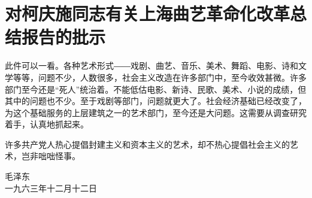 \section[对柯庆施同志有关上海曲艺革命化改革总结报告的批示（一九六三年十二月十二日）]{对柯庆施同志有关上海曲艺革命化改革总结报告的批示}


此件可以一看。各种艺术形式――戏剧、曲艺、音乐、美术、舞蹈、电影、诗和文学等等，问题不少，人数很多，社会主义改造在许多部门中，至今收效甚微。许多部门至今还是“死人”统治着。不能低估电影、新诗、民歌、美术、小说的成绩，但其中的问题也不少。至于戏剧等部门，问题就更大了。社会经济基础已经改变了，为这个基础服务的上层建筑之一的艺术部门，至今还是大问题。这需要从调查研究着手，认真地抓起来。

许多共产党人热心提倡封建主义和资本主义的艺术，却不热心提倡社会主义的艺术，岂非咄咄怪事。

{\raggedleft 毛泽东\\一九六三年十二月十二日\par}

